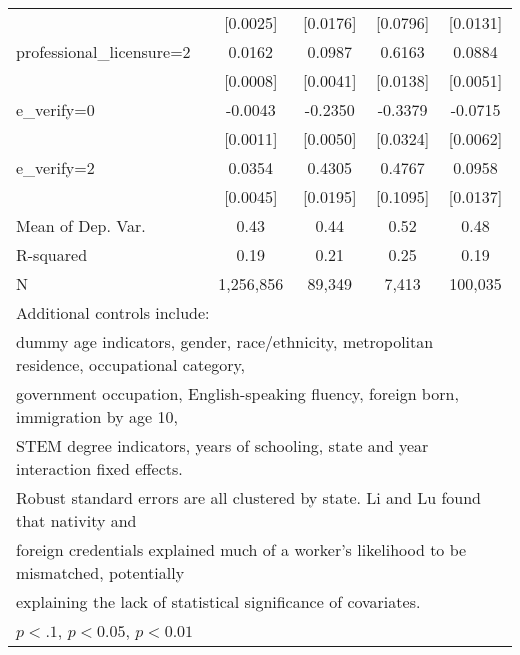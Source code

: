 \begin{table}[htbp]
\begin{tabular}{l*{4}{c}}
                    &    [0.0025]         &    [0.0176]         &    [0.0796]         &    [0.0131]         \\
\addlinespace
professional\_licensure=2&      0.0162\sym{***}&      0.0987\sym{***}&      0.6163\sym{***}&      0.0884\sym{***}\\
                    &    [0.0008]         &    [0.0041]         &    [0.0138]         &    [0.0051]         \\
\addlinespace
e\_verify=0          &     -0.0043\sym{***}&     -0.2350\sym{***}&     -0.3379\sym{***}&     -0.0715\sym{***}\\
                    &    [0.0011]         &    [0.0050]         &    [0.0324]         &    [0.0062]         \\
\addlinespace
e\_verify=2          &      0.0354\sym{***}&      0.4305\sym{***}&      0.4767\sym{***}&      0.0958\sym{***}\\
                    &    [0.0045]         &    [0.0195]         &    [0.1095]         &    [0.0137]         \\
\midrule
Mean of Dep. Var.   &        0.43         &        0.44         &        0.52         &        0.48         \\
R-squared           &        0.19         &        0.21         &        0.25         &        0.19         \\
N                   &   1,256,856         &      89,349         &       7,413         &     100,035         \\
\bottomrule
\multicolumn{5}{l}{\footnotesize Additional controls include:}\\
\multicolumn{5}{l}{\footnotesize dummy age indicators, gender, race/ethnicity, metropolitan residence, occupational category,}\\
\multicolumn{5}{l}{\footnotesize government occupation, English-speaking fluency, foreign born, immigration by age 10,}\\
\multicolumn{5}{l}{\footnotesize STEM degree indicators, years of schooling, state and year interaction fixed effects.}\\
\multicolumn{5}{l}{\footnotesize Robust standard errors are all clustered by state. Li and Lu found that nativity and}\\
\multicolumn{5}{l}{\footnotesize foreign credentials explained much of a worker's likelihood to be mismatched, potentially}\\
\multicolumn{5}{l}{\footnotesize explaining the lack of statistical significance of covariates.}\\
\multicolumn{5}{l}{\footnotesize \sym{*} \(p<.1\), \sym{**} \(p<0.05\), \sym{***} \(p<0.01\)}\\
\end{tabular}
\end{table}
